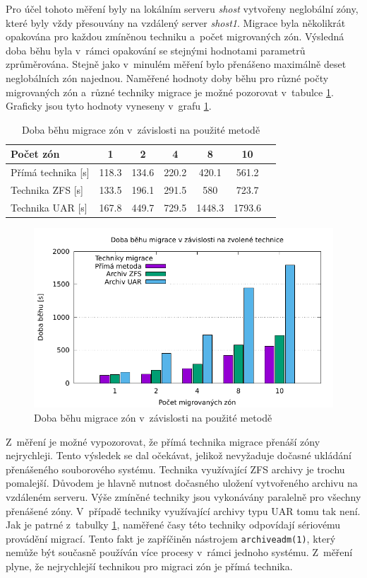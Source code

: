 Pro účel tohoto měření byly na lokálním serveru \textit{shost} vytvořeny neglobální zóny, které byly vždy přesouvány na vzdálený
server \textit{shost1}. Migrace byla několikrát opakována pro každou zmíněnou techniku a~počet migrovaných zón. Výsledná
doba běhu byla v~rámci opakování se stejnými hodnotami parametrů zprůměrována. Stejně jako v~minulém měření bylo přenášeno maximálně
deset neglobálních zón najednou. Naměřené hodnoty doby běhu pro různé počty migrovaných zón a~různé techniky migrace je možné
pozorovat v~tabulce \ref{table:measuremet:migration}. Graficky jsou tyto hodnoty vyneseny v~grafu \ref{graph:measuremet:migration}.
\begin{table}
  \centering
  \label{table:measuremet:migration}
  \caption{Doba běhu migrace zón v~závislosti na použité metodě}
  \begin{tabular}{ l | c c c c c c}
   Počet zón & 1 & 2 & 4 & 8 & 10 &   \\ \hline
   Přímá technika [s] & 118.3 & 134.6 & 220.2 & 420.1 & 561.2 & \\
   Technika ZFS [s] & 133.5 & 196.1 & 291.5 & 580 & 723.7 & \\
   Technika UAR [s] & 167.8 & 449.7 & 729.5 & 1448.3 & 1793.6 & \\
  \end{tabular}
\end{table}

\begin{figure}
  \centering
  \label{graph:measuremet:migration}
  \includegraphics{assets/pdfs/measurement_migration.pdf}
  \caption{Doba běhu migrace zón v~závislosti na použité metodě}
\end{figure}

Z~měření je možné vypozorovat, že přímá technika migrace přenáší zóny nejrychleji. Tento výsledek se dal očekávat, jelikož nevyžaduje
dočasné ukládání přenášeného souborového systému. Technika využívající ZFS archivy je trochu pomalejší. Důvodem je hlavně nutnost
dočasného uložení vytvořeného archivu na vzdáleném serveru. Výše zmíněné techniky jsou vykonávány paralelně pro všechny přenášené
zóny. V~případě techniky využívající archivy typu UAR tomu tak není. Jak je patrné z~tabulky \ref{table:measuremet:migration},
naměřené časy této techniky odpovídají sériovému provádění migrací. Tento fakt je zapříčiněn nástrojem \verb|archiveadm(1)|, který
nemůže být současně používán více procesy v~rámci jednoho systému. Z~měření plyne, že nejrychlejší technikou pro migraci zón je
přímá technika.
